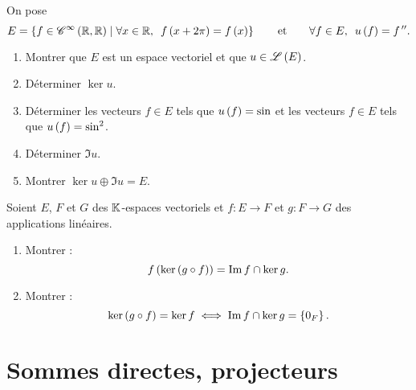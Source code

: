 \begin{corr}
\end{corr}

\begin{exo}
On pose \[E=\accol{f\in\ensclasse{\infty}{\R}{\R}\tq\quantifs{\forall x\in\R}f\paren{x+2\pi}=f\paren{x}}\qquad\text{et}\qquad\quantifs{\forall f\in E}u\paren{f}=f\seconde.\]

\begin{enumerate}
\item Montrer que \(E\) est un espace vectoriel et que \(u\in\mathscr{L}\left(E\right)\). \\

\item Déterminer \(\ker u\). \\

\item Déterminer les vecteurs \(f\in E\) tels que \(u\left(f\right)=\sin\) et les vecteurs \(f\in E\) tels que \(u\left(f\right)=\sin^2\). \\

\item Déterminer \(\Im u\). \\

\item Montrer \(\ker u\oplus\Im u=E\).
\end{enumerate}
\end{exo}

\begin{corr}
\end{corr}

\begin{exo}[Exercice 9]
Soient \(E\), \(F\) et \(G\) des \(\mathbb{K}\)-espaces vectoriels et \(f:E\to F\) et \(g:F\to G\) des applications linéaires.

\begin{enumerate}
\item Montrer : \[f\left(\ker\left(g\circ f\right)\right)=\operatorname{Im} f\cap\ker g.\]

\item Montrer : \[\ker\left(g\circ f\right)=\ker f\iff\operatorname{Im} f\cap\ker g=\left\lbrace0_F\right\rbrace.\]
\end{enumerate}
\end{exo}

\begin{corr}
\end{corr}

\section{Sommes directes, projecteurs}

